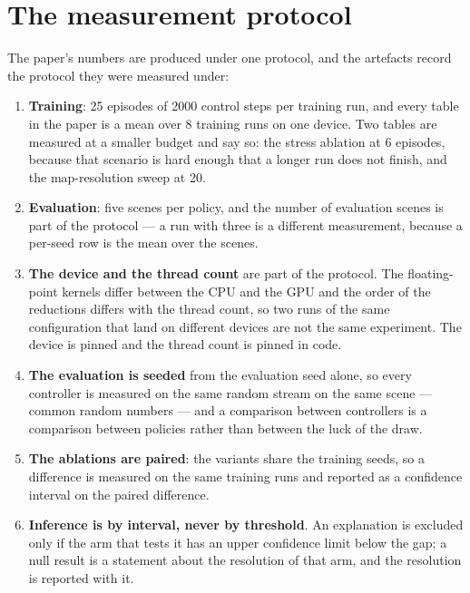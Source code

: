 \documentclass[11pt,a4paper]{article}
\begin{document}
\section{The measurement protocol}
The paper's numbers are produced under one protocol, and the artefacts record the protocol they were measured under:
\begin{enumerate}[leftmargin=*,label=\textcolor{uavblue}{\bfseries\arabic*.},itemsep=2pt,topsep=2pt]
\item \textbf{Training}: 25 episodes of 2000 control steps per training run, and every table in the paper is a mean over 8 training runs on one device. Two tables are measured at a smaller budget and say so: the stress ablation at 6 episodes, because that scenario is hard enough that a longer run does not finish, and the map-resolution sweep at 20.
\item \textbf{Evaluation}: five scenes per policy, and the number of evaluation scenes is part of the protocol --- a run with three is a different measurement, because a per-seed row is the mean over the scenes.
\item \textbf{The device and the thread count} are part of the protocol. The floating-point kernels differ between the CPU and the GPU and the order of the reductions differs with the thread count, so two runs of the same configuration that land on different devices are not the same experiment. The device is pinned and the thread count is pinned in code.
\item \textbf{The evaluation is seeded} from the evaluation seed alone, so every controller is measured on the same random stream on the same scene --- common random numbers --- and a comparison between controllers is a comparison between policies rather than between the luck of the draw.
\item \textbf{The ablations are paired}: the variants share the training seeds, so a difference is measured on the same training runs and reported as a confidence interval on the paired difference.
\item \textbf{Inference is by interval, never by threshold}. An explanation is excluded only if the arm that tests it has an upper confidence limit below the gap; a null result is a statement about the resolution of that arm, and the resolution is reported with it.
\end{enumerate}
\end{document}
